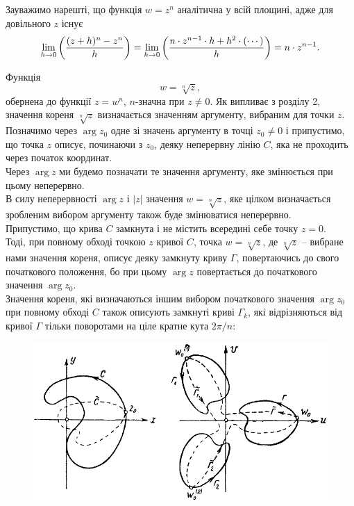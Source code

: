 Зауважимо нарешті, що функція $w = z^n$ аналітична у всій площині, адже для довільного $z$ існує
\begin{equation}
	\label{eq:3.1.8}
	\displaystyle\lim\limits_{h \to 0} \left(\dfrac{(z + h)^n - z^n}{h}\right) = \displaystyle\lim\limits_{h \to 0} \left(\dfrac{n \cdot z^{n - 1} \cdot h + h^2 \cdot (\cdots)}{h}\right) = n \cdot z^{n - 1}.
\end{equation}

Функція
\begin{equation}
	\label{eq:3.1.9}
	w = \sqrt[n]{z},
\end{equation}
обернена до функції $z = w^n$, $n$-значна при $z \ne 0$. Як випливає з розділу 2, значення кореня $\sqrt[n]{z}$ визначається значенням аргументу, вибраним для точки $z$. \\

Позначимо через $\arg z_0$ одне зі значень аргументу в точці $z_0 \ne 0$ і припустимо, що точка $z$ описує, починаючи з $z_0$, деяку неперервну лінію $C$, яка не проходить через початок координат. \\

Через $\arg z$ ми будемо позначати те значення аргументу, яке змінюється при цьому неперервно. \\

В силу неперервності $\arg z$ і $|z|$ значення $w = \sqrt[n]{z}$, яке цілком визначається зробленим вибором аргументу також буде змінюватися неперервно. \\

Припустимо, що крива $C$ замкнута і не містить всередині себе точку $z = 0$. \\

Тоді, при повному обході точкою $z$ кривої $C$, точка $w = \sqrt[n]{z}$, де $\sqrt[n]{z}$ -- вибране нами значення кореня, описує деяку замкнуту криву $\Gamma$, повертаючись до свого початкового положення, бо при цьому $\arg z$ повертається до початкового значення $\arg z_0$. \\

Значення кореня, які визначаються іншим вибором початкового значення $\arg z_0$ при повному обході $C$ також описують замкнуті криві $\Gamma_k$, які відрізняються від кривої $\Gamma$ тільки поворотами на ціле кратне кута $2 \pi / n$:
\begin{figure}[H]
	\centering
	\includegraphics[width=.8\linewidth]{mal-10.png}
\end{figure}

